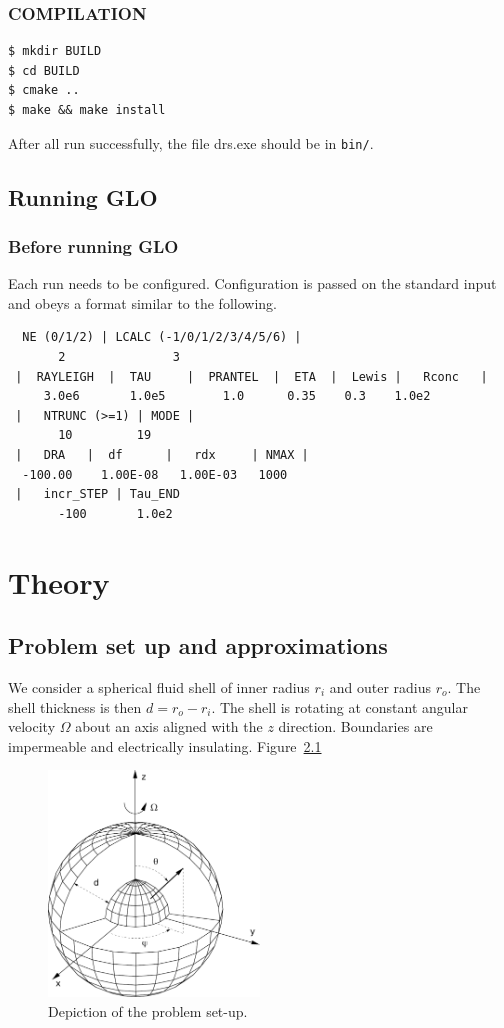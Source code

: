 \documentclass[a4paper,10pt]{book}
\begin{document}
\subsection{COMPILATION}
\begin{verbatim}
$ mkdir BUILD
$ cd BUILD
$ cmake ..
$ make && make install
\end{verbatim}
After all run successfully, the file drs.exe should be in \verb|bin/|.

\section{Running GLO}
\subsection{Before running GLO}
\label{s:runConfig}
Each run needs to be configured. Configuration is passed on the standard input
and obeys a format similar to the following.
\begin{tiny}
\begin{verbatim}
  NE (0/1/2) | LCALC (-1/0/1/2/3/4/5/6) |
       2               3
 |  RAYLEIGH  |  TAU     |  PRANTEL  |  ETA  |  Lewis |   Rconc   |
     3.0e6       1.0e5        1.0      0.35    0.3    1.0e2
 |   NTRUNC (>=1) | MODE |
       10         19
 |   DRA   |  df      |   rdx     | NMAX |
  -100.00    1.00E-08   1.00E-03   1000
 |   incr_STEP | Tau_END
       -100       1.0e2
\end{verbatim}
\end{tiny}

\chapter{Theory}

\section{Problem set up and approximations}
\label{s:problemSetup}
We consider a spherical fluid shell of inner radius $r_i$ and outer radius
$r_o$. The shell thickness is then $d = r_o - r_i$. The shell is rotating at
constant angular velocity $\Omega$ about an axis aligned with the $z$ direction.
Boundaries are impermeable and electrically insulating. Figure~\ref{f:setup}
\begin{figure}[htb]
\centering
\includegraphics[width=0.5\textwidth]{figs/sphshell}
\caption{Depiction of the problem set-up.}
\label{f:setup}
\end{figure}
\end{document}
